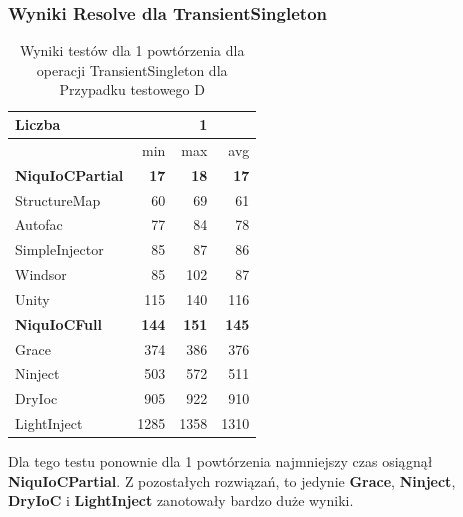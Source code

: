 \documentclass[12pt]{article}
\begin{document}
\subsubsection{Wyniki Resolve dla TransientSingleton}
\begin{table}[H]
\captionsetup{belowskip=0pt,aboveskip=0pt}
\begin{center}
\begin{small}
	\begin{tabular}{ | l | r r r | }
    		\hline
Liczba & & 1 & \\ \hline
 & min & max & avg \\ \hline
\textbf{NiquIoCPartial} & \textbf{17} & \textbf{18} & \textbf{17} \\ \hline
StructureMap & 60 & 69 & 61 \\ \hline
Autofac & 77 & 84 & 78 \\ \hline
SimpleInjector & 85 & 87 & 86 \\ \hline
Windsor & 85 & 102 & 87 \\ \hline
Unity & 115 & 140 & 116 \\ \hline
\textbf{NiquIoCFull} & \textbf{144} & \textbf{151} & \textbf{145} \\ \hline
Grace & 374 & 386 & 376 \\ \hline
Ninject & 503 & 572 & 511 \\ \hline
DryIoc & 905 & 922 & 910 \\ \hline
LightInject & 1285 & 1358 & 1310 \\ \hline
  	\end{tabular}
\end{small}
\end{center}
\caption{Wyniki testów dla 1 powtórzenia dla operacji TransientSingleton dla Przypadku testowego D}
\label{TestCaseD_TransientSingleton}
\end{table}
Dla tego testu ponownie dla 1 powtórzenia najmniejszy czas osiągnął \textbf{NiquIoCPartial}. Z pozostałych rozwiązań, to jedynie \textbf{Grace}, \textbf{Ninject}, \textbf{DryIoC} i \textbf{LightInject} zanotowały bardzo duże wyniki.
\\ \\
\end{document}
